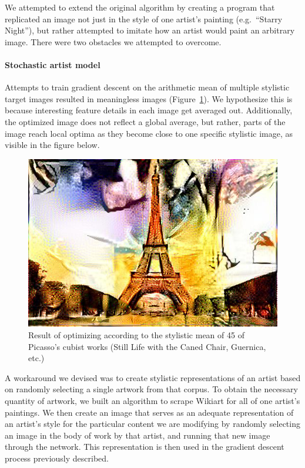\documentclass[11pt,letterpaper,journal]{IEEEtran}
\begin{document}
We attempted to extend the original algorithm by creating a program that
replicated an image not just in the style of one artist's painting (e.g.\
``Starry Night''), but rather attempted to imitate how an artist would paint an
arbitrary image. There were two obstacles we attempted to overcome.

\paragraph{Stochastic artist model}

Attempts to train gradient descent on the arithmetic mean of multiple
stylistic target images resulted in meaningless images
(Figure~\ref{fig:picasso}). We hypothesize this is because interesting feature
details in each image get averaged out. Additionally, the optimized image does
not reflect a global average, but rather, parts of the image reach local optima
as they become close to one specific stylistic image, as visible in the figure
below.

\begin{figure}[h]
  \centering
  \includegraphics[width=0.8\linewidth]{picasso.jpg}
  \caption{Result of optimizing according to the stylistic mean of 45 of
  Picasso's cubist works (Still Life with the Caned Chair, Guernica, etc.)}
  \label{fig:picasso}
\end{figure}

A workaround we devised was to
 create stylistic representations of an artist based on randomly selecting a
 single artwork from that corpus.
 To obtain the necessary
quantity of artwork, we built an algorithm to scrape Wikiart for all of one artist's
paintings. We then create an image that serves as an adequate representation of
an artist's style for the particular content we are modifying by randomly
selecting an image in the body of work by that artist, and running that new
image through the network. This representation is then used in the gradient
descent process previously described.
\end{document}
